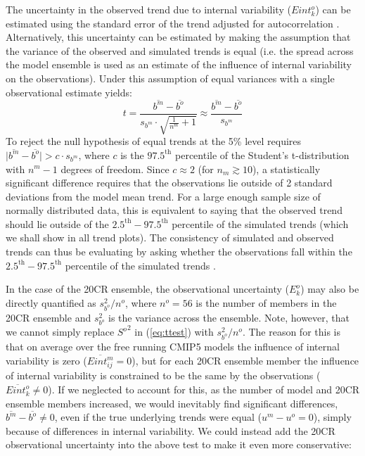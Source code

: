 \documentclass{ametsoc}
\begin{document}
The uncertainty in the observed trend due to internal variability 
($Eint^o_k$) can be estimated using the standard error of the trend adjusted for autocorrelation 
\citep[e.g.][]{Santer_et_al_2008}. Alternatively, this uncertainty can be estimated by making 
the assumption that the variance of the observed and simulated trends is equal (i.e. the spread 
across the model ensemble is used as an estimate of the influence of internal variability on 
the observations). Under this assumption of equal variances with a single observational
estimate yields:
\begin{equation}
t = \frac{\overline{b^m} - \overline{b^o}}{s_{b^m} \cdot \sqrt{\frac{1}{n^m} + 1}} 
\approx \frac{\overline{b^m} - \overline{b^o}}{s_{b^m}}
\end{equation} 
To reject the null hypothesis of equal trends at the 5\% level requires 
$\mathopen|\overline{b^m} - \overline{b^o}\mathclose| > c \cdot s_{b^m}$, where $c$ is 
the $97.5^\textrm{th}$ percentile of the Student's t-distribution with
$n^m-1$ degrees of freedom. Since $c \approx 2$ (for $n_m \gtrsim 10$), a statistically 
significant difference requires
that the observations lie outside of 2 standard deviations from the model mean trend.
For a large enough sample size of normally distributed data, this is equivalent to saying that the observed trend 
should lie outside of the $2.5^{\textrm{th}}-97.5^{\textrm{th}}$ 
percentile of the simulated trends (which we shall show in all trend plots). The 
consistency of simulated and observed trends can thus be evaluating by asking 
whether the observations fall within the $2.5^{\textrm{th}}-97.5^{\textrm{th}}$ 
percentile of the simulated trends \citep{Swart_et_al_2015, Gillett_and_Fyfe_2013, Gillett_et_al_2013}.

In the case of the 20CR ensemble, the observational uncertainty ($E^o_k$) may also be directly quantified as
$s_{b^o}^2/n^o$, where $n^o=56$ is the number of members in the 20CR ensemble and $s_{b^o}^2$ is the variance across the 
ensemble. Note, however, that we cannot simply
replace ${S^o}^2$ in (\ref{eq:ttest}) with $s_{b^o}^2/n^o$. The reason for this is that on average over the
free running CMIP5 models the influence of internal variability is zero ($\overline{Eint^m_{ij}}=0$), but for each
20CR ensemble member the influence of internal variability is constrained to be the same by the observations 
($\overline{Eint_k^o} \ne 0$).  If we neglected to account for this, as the number
of model and 20CR ensemble members increased, we would inevitably find significant differences,  
$\overline{b^m} - \overline{b^o} \ne 0$,  even if the true underlying trends were equal ($u^m - u^o = 0$),
simply because of differences in internal variability. We could instead add the 20CR 
observational uncertainty into the above test to make it even more conservative:
\end{document}
